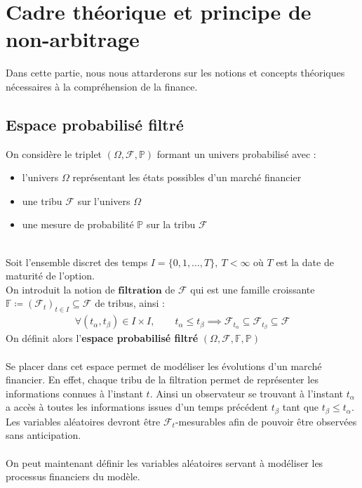 \section{Cadre théorique et principe de non-arbitrage}
Dans cette partie, nous nous attarderons sur les notions et concepts théoriques nécessaires à la compréhension de la finance.
\subsection{Espace probabilisé filtré}
On considère le triplet $(\Omega,\mathcal{F},\mathbb{P})$ formant un univers probabilisé avec :
\begin{itemize}
    \item[$\bullet$] l'univers $\Omega$ représentant les états possibles d'un marché financier
    \item[$\bullet$] une tribu $\mathcal{F}$ sur l'univers $\Omega$
    \item[$\bullet$] une mesure de probabilité $\mathbb{P}$ sur la tribu $\mathcal{F}$
\end{itemize}
~\\
Soit l'ensemble discret des temps $I = \{0,1,...,T\}, \: T < \infty$ où $T$ est la date de maturité de l'option. \\
On introduit la notion de $\textbf{filtration}$ de $\mathcal{F}$ qui est une famille croissante $\mathbb{F} \coloneq  (\mathcal{F}_t)_{t\in I} \subseteq \mathcal{F}$ de tribus, ainsi :
\begin{align*}
    \forall (t_\alpha,t_\beta) \in I \times I, \qquad t_\alpha \le t_\beta \implies \mathcal{F}_{t_\alpha} \subseteq \mathcal{F}_{t_\beta} \subseteq \mathcal{F}
\end{align*}
\cite{Filtration}
On définit alors l'\textbf{espace probabilisé filtré} $(\Omega, \mathcal{F}, \mathbb{F}, \mathbb{P})$ \\ \\
\remark Se placer dans cet espace permet de modéliser les évolutions d'un marché financier. En effet, chaque tribu de la filtration permet de représenter les informations connues à l'instant $t$. Ainsi un observateur se trouvant à l'instant $t_{\alpha}$ a accès à toutes les informations issues d'un temps précédent $t_\beta$ tant que $t_\beta \leq t_{\alpha}$. Les variables aléatoires devront être $\mathcal{F}_t$-mesurables afin de pouvoir être observées sans anticipation. \\ \\
On peut maintenant définir les variables aléatoires servant à modéliser les processus financiers du modèle.
